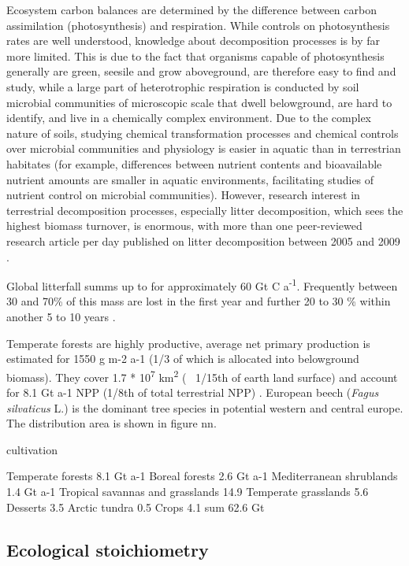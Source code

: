 Ecosystem carbon balances are determined by the difference between carbon assimilation (photosynthesis) and respiration. While controls on photosynthesis rates are well understood, knowledge about decomposition processes is by far more limited. This is due to the fact that organisms capable of photosynthesis generally are green, seesile and grow aboveground, are therefore easy to find and study, while a large part of heterotrophic respiration is conducted by soil microbial communities of microscopic scale that dwell belowground, are  hard to identify, and live in a chemically complex environment. Due to the complex nature of soils, studying chemical transformation processes and chemical controls over microbial communities and physiology is easier in aquatic than in terrestrian habitates (for example, differences between nutrient contents and bioavailable nutrient amounts are smaller in aquatic environments, facilitating studies of nutrient control on microbial communities). However, research interest in terrestrial decomposition processes, especially litter decomposition, which sees the highest biomass turnover, is enormous, with more than one peer-reviewed research article per day published on litter decomposition between 2005 and 2009 \citep{Prescott2010}. 

Global litterfall summs up to for approximately 60 Gt C a\textsuperscript{-1}. Frequently between 30 and 70\% of this mass are lost in the first year and further 20 to 30 \% within another 5 to 10 years \citep[p.157]{Chapin2002}.

Temperate forests are highly productive, average net primary production is estimated for 1550 g m-2 a-1 (1/3 of which is allocated into belowground biomass). They cover 1.7 * 10\textsuperscript{7} km\textsuperscript{2} (~ 1/15th of earth land surface) and account for 8.1 Gt a-1 NPP (1/8th of total terrestrial NPP) \citep[p?]{Chapin2002}. European beech (\emph{Fagus silvaticus} L.) is the dominant tree species in potential western and central europe. The distribution area is shown in figure nn. 

cultivation


Temperate forests 8.1 Gt a-1
Boreal forests 2.6 Gt a-1
Mediterranean shrublands 1.4 Gt a-1
Tropical savannas and grasslands 14.9
Temperate grasslands 5.6
Desserts 3.5
Arctic tundra 0.5 
Crops 4.1
sum 62.6 Gt



\subsection{Ecological stoichiometry}

